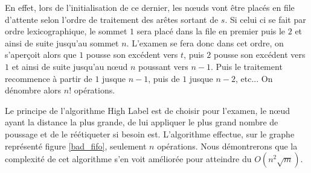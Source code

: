 En effet, lors de l'initialisation de ce dernier, les n\oe uds vont être placés en file d'attente
selon l'ordre de traitement des arêtes sortant de $s$. Si celui ci se fait par ordre
lexicographique, le sommet $1$ sera placé dans la file en premier puis le $2$ et ainsi de suite
jusqu'au sommet $n$. L'examen se fera donc dans cet ordre, on s'aperçoit alors que $1$ pousse son
excédent vers $t$, puis $2$ pousse son excédent vers $1$ et ainsi de suite jusqu'au n\oe ud $n$
poussant vers $n-1$.
Puis le traitement recommence à partir de $1$ jusque $n-1$, puis de $1$ jusque $n-2$, etc... On
dénombre alors $n!$ opérations.

Le principe de l'algorithme High Label est de choisir pour l'examen, le n\oe ud ayant la distance la
plus grande, de lui appliquer le plus grand nombre de poussage et de le réétiqueter si besoin est.
L'algorithme effectue, sur le graphe représenté figure \ref{bad_fifo}, seulement $n$ opérations.
Nous démontrerons que la complexité de cet algorithme s'en voit améliorée pour atteindre du
$O(n^2\sqrt{m})$.

